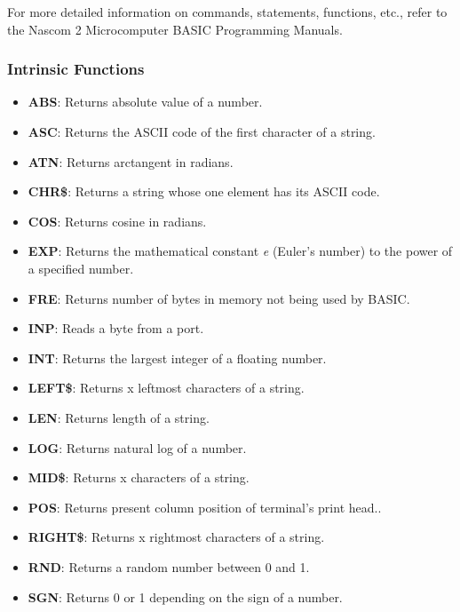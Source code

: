     For more detailed information on commands, statements, functions, etc.,
    refer to the Nascom 2 Microcomputer BASIC Programming Manuals\cite{nascombasic}.

        \subsubsection{Intrinsic Functions}

        \begin{itemize}
            \item \textbf{ABS}: Returns absolute value of a number.
            \item \textbf{ASC}: Returns the ASCII code of the first character of a string.
            \item \textbf{ATN}: Returns arctangent in radians.
            \item \textbf{CHR\$}: Returns a string whose one element has its ASCII code.
            \item \textbf{COS}: Returns cosine in radians.
            \item \textbf{EXP}: Returns the mathematical constant \textit{e} (Euler’s number) to the power of a specified number.
            \item \textbf{FRE}: Returns number of bytes in memory not being used by BASIC.
            \item \textbf{INP}: Reads a byte from a port.
            \item \textbf{INT}: Returns the largest integer of a floating number.
            \item \textbf{LEFT\$}: Returns x leftmost characters of a string.
            \item \textbf{LEN}: Returns length of a string.
            \item \textbf{LOG}: Returns natural log of a number.
            \item \textbf{MID\$}: Returns x characters of a string.
            \item \textbf{POS}: Returns present column position of terminal's print head..
            \item \textbf{RIGHT\$}: Returns x rightmost characters of a string.
            \item \textbf{RND}: Returns a random number between 0 and 1.
            \item \textbf{SGN}: Returns 0 or 1 depending on the sign of a number.

\end{itemize}

